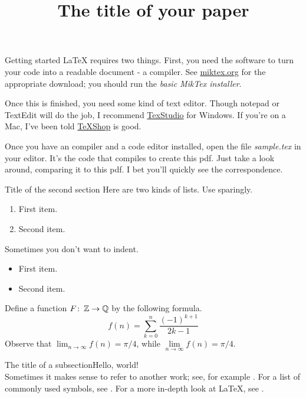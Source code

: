 \documentclass{amsart}					%
\title{The title of your paper} %
\newcommand{\co}{\colon\thinspace}
\newcommand{\Z}{\mathbb{Z}}
\newcommand{\Q}{\mathbb{Q}}
\theoremstyle{definition}
\begin{document}
 
\maketitle 			%
\tableofcontents 	%

\begin{section}{Getting started}
LaTeX requires two things. First, you need the software to turn your code into a readable document - a compiler. See \href{http://miktex.org}{miktex.org} for the appropriate download; you should run the \emph{basic MikTex installer}.

Once this is finished, you need some kind of text editor. Though notepad or TextEdit will do the job, I recommend \href{http://texstudio.sourceforge.net/}{TexStudio} for Windows. If you're on a Mac, I've been told \href{https://en.wikipedia.org/wiki/TeXShop}{TeXShop} is good.

Once you have an compiler and a code editor installed, open the file \emph{sample.tex} in your editor. It's the code that compiles to create this pdf. Just take a look around, comparing it to this pdf. I bet you'll quickly see the correspondence.
\end{section}

\begin{section}{Title of the second section}
Here are two kinds of lists. Use sparingly.
\begin{enumerate}
\item First item.
\item Second item.
\end{enumerate}
\noindent Sometimes you don't want to indent.
\begin{itemize}
\item First item.
\item Second item.
\end{itemize}
Define a function $F\co\Z\to\Q$ by the following formula. \[f(n)=\sum\limits_{k=0}^n \frac{(-1)^{k+1}}{2k-1}\] Observe that $\lim_{n\to\infty}f(n)=\pi/4$, while $\lim\limits_{n\to\infty}f(n)=\pi/4$.
\begin{subsection}{The title of a subsection}\label{section1}Hello, world!\\ %
Sometimes it makes sense to refer to another work; see, for example \cite{GS}. For a list of commonly used symbols, see \cite{L}. For a more in-depth look at \LaTeX, see \cite{O}.
\end{subsection}
\end{section}
\end{document}
